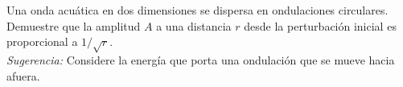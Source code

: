 \item Una onda acuática en dos dimensiones se dispersa en ondulaciones circulares. Demuestre que la amplitud $A$ a una distancia $r$ desde la perturbación inicial es proporcional a $1/\sqrt{r}$. \\
\textit{Sugerencia:} Considere la energía que porta una ondulación que se mueve hacia afuera.